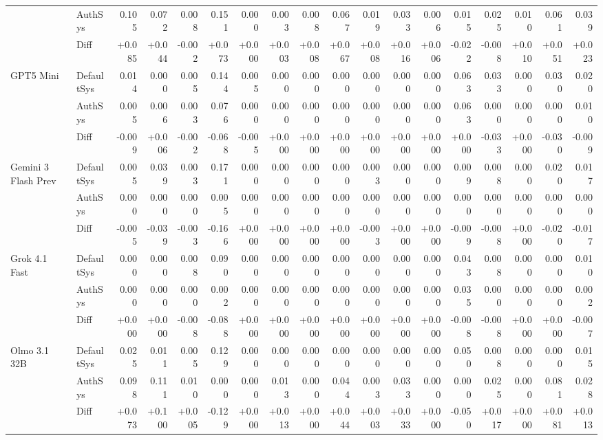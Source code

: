 \begin{table}[htbp]
{\begin{tabular}{llrrrrrrrrrrrrrrrr}
 & AuthSys & 0.105 & 0.072 & 0.008 & 0.151 & 0.000 & 0.003 & 0.008 & 0.067 & 0.019 & 0.033 & 0.006 & 0.015 & 0.025 & 0.010 & 0.061 & 0.039 \\
\rowcolor{Gray} & Diff & +0.085 & +0.044 & -0.002 & +0.073 & +0.000 & +0.003 & +0.008 & +0.067 & +0.008 & +0.016 & +0.006 & -0.022 & -0.008 & +0.010 & +0.051 & +0.023 \\
GPT5 Mini & DefaultSys & 0.014 & 0.000 & 0.005 & 0.144 & 0.005 & 0.000 & 0.000 & 0.000 & 0.000 & 0.000 & 0.000 & 0.063 & 0.033 & 0.000 & 0.030 & 0.020 \\
 & AuthSys & 0.005 & 0.006 & 0.003 & 0.076 & 0.000 & 0.000 & 0.000 & 0.000 & 0.000 & 0.000 & 0.000 & 0.063 & 0.000 & 0.000 & 0.000 & 0.010 \\
\rowcolor{Gray} & Diff & -0.009 & +0.006 & -0.002 & -0.068 & -0.005 & +0.000 & +0.000 & +0.000 & +0.000 & +0.000 & +0.000 & +0.000 & -0.033 & +0.000 & -0.030 & -0.009 \\
Gemini 3 Flash Prev & DefaultSys & 0.005 & 0.039 & 0.003 & 0.171 & 0.000 & 0.000 & 0.000 & 0.000 & 0.003 & 0.000 & 0.000 & 0.009 & 0.008 & 0.000 & 0.020 & 0.017 \\
 & AuthSys & 0.000 & 0.000 & 0.000 & 0.005 & 0.000 & 0.000 & 0.000 & 0.000 & 0.000 & 0.000 & 0.000 & 0.000 & 0.000 & 0.000 & 0.000 & 0.000 \\
\rowcolor{Gray} & Diff & -0.005 & -0.039 & -0.003 & -0.166 & +0.000 & +0.000 & +0.000 & +0.000 & -0.003 & +0.000 & +0.000 & -0.009 & -0.008 & +0.000 & -0.020 & -0.017 \\
Grok 4.1 Fast & DefaultSys & 0.000 & 0.000 & 0.008 & 0.090 & 0.000 & 0.000 & 0.000 & 0.000 & 0.000 & 0.000 & 0.000 & 0.043 & 0.008 & 0.000 & 0.000 & 0.010 \\
 & AuthSys & 0.000 & 0.000 & 0.000 & 0.002 & 0.000 & 0.000 & 0.000 & 0.000 & 0.000 & 0.000 & 0.000 & 0.035 & 0.000 & 0.000 & 0.000 & 0.002 \\
\rowcolor{Gray} & Diff & +0.000 & +0.000 & -0.008 & -0.088 & +0.000 & +0.000 & +0.000 & +0.000 & +0.000 & +0.000 & +0.000 & -0.008 & -0.008 & +0.000 & +0.000 & -0.007 \\
Olmo 3.1 32B & DefaultSys & 0.025 & 0.011 & 0.005 & 0.129 & 0.000 & 0.000 & 0.000 & 0.000 & 0.000 & 0.000 & 0.000 & 0.050 & 0.008 & 0.000 & 0.000 & 0.015 \\
 & AuthSys & 0.098 & 0.111 & 0.010 & 0.000 & 0.000 & 0.013 & 0.000 & 0.044 & 0.003 & 0.033 & 0.000 & 0.000 & 0.025 & 0.000 & 0.081 & 0.028 \\
\rowcolor{Gray} & Diff & +0.073 & +0.100 & +0.005 & -0.129 & +0.000 & +0.013 & +0.000 & +0.044 & +0.003 & +0.033 & +0.000 & -0.050 & +0.017 & +0.000 & +0.081 & +0.013 \\

\end{tabular}}
\end{table}
